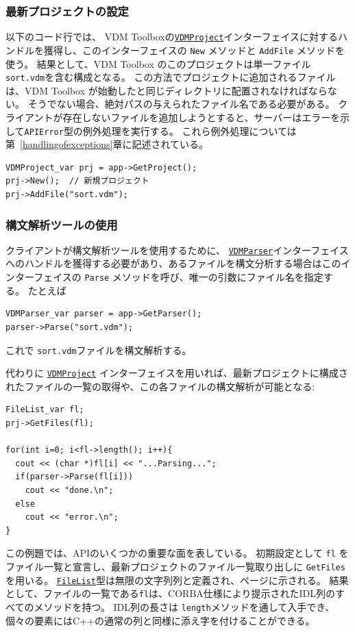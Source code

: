 \documentclass[\pformat,12pt]{jarticle}
\newcommand{\FileList}{\hyperlink{type.FileList}{FileList}}
\newcommand{\VDMParser}{\hyperlink{interface.VDMParser}{VDMParser}}
\newcommand{\VDMProject}{\hyperlink{interface.VDMProject}{VDMProject}}
\begin{document}
\subsubsection{最新プロジェクトの設定}

以下のコード行では、 VDM Toolboxの{\tt \VDMProject}インターフェイスに対するハンドルを獲得し、このインターフェイスの {\tt New} メソッドと {\tt AddFile} メソッドを使う。
結果として、VDM Toolbox のこのプロジェクトは単一ファイル {\tt sort.vdm}を含む構成となる。
この方法でプロジェクトに追加されるファイルは、VDM Toolbox が始動したと同じディレクトリに配置されなければならない。
そうでない場合、絶対パスの与えられたファイル名である必要がある。
クライアントが存在しないファイルを追加しようとすると、サーバーはエラーを示して{\tt APIError}型の例外処理を実行する。
これら例外処理については第~\ref{handlingofexceptions}章に記述されている。

\begin{verbatim}
VDMProject_var prj = app->GetProject();
prj->New();  // 新規プロジェクト
prj->AddFile("sort.vdm");
\end{verbatim}

\subsubsection{構文解析ツールの使用}

クライアントが構文解析ツールを使用するために、 {\tt \VDMParser}インターフェイスへのハンドルを獲得する必要があり、あるファイルを構文分析する場合はこのインターフェイスの {\tt Parse} メソッドを呼び、唯一の引数にファイル名を指定する。
たとえば

\begin{verbatim}
VDMParser_var parser = app->GetParser();
parser->Parse("sort.vdm");
\end{verbatim}

これで {\tt sort.vdm}ファイルを構文解析する。

代わりに {\tt \VDMProject} インターフェイスを用いれば、最新プロジェクトに構成されたファイルの一覧の取得や、この各ファイルの構文解析が可能となる:

\begin{verbatim}
FileList_var fl;
prj->GetFiles(fl);

for(int i=0; i<fl->length(); i++){
  cout << (char *)fl[i] << "...Parsing...";
  if(parser->Parse(fl[i]))
    cout << "done.\n";
  else
    cout << "error.\n";
}
\end{verbatim}

この例題では、APIのいくつかの重要な面を表している。
初期設定として {\tt fl} をファイル一覧と宣言し、最新プロジェクトのファイル一覧取り出しに {\tt GetFiles}を用いる。
 {\tt \FileList}型は無限の文字列列と定義され、\pageref{ref:corbatypes}ページに示される。 
結果として、ファイルの一覧である{\tt fl}は、CORBA仕様\cite{OMG&96}により提示されたIDL列のすべてのメソッドを持つ。
IDL列の長さは {\tt length}メソッドを通して入手でき、個々の要素にはC++の通常の列と同様に添え字を付けることができる。
\end{document}
